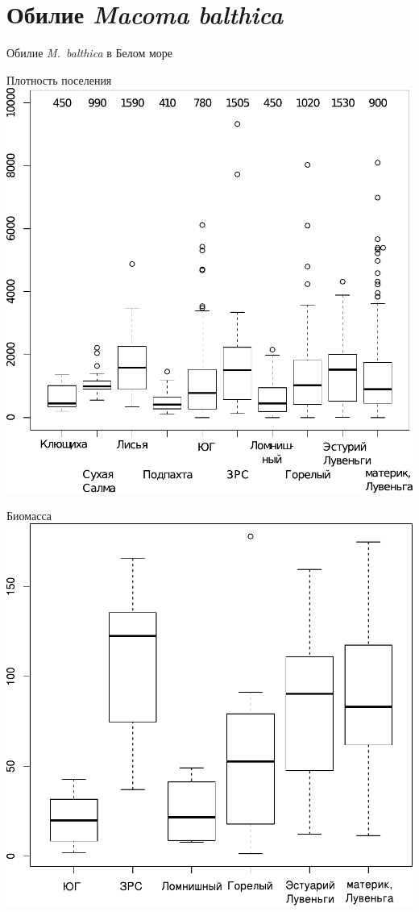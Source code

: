 \documentclass{beamer}
\begin{document}
		\section[Обилие]{Обилие {\it Macoma balthica}}
\begin{frame}{Обилие {\it M.~balthica} в Белом море}
	\begin{minipage}[t]{.49\linewidth}
		\begin{center}
		{\footnotesize Плотность поселения}
			\includegraphics[width=\textwidth]{N2_area_White1.pdf}
		\end{center}
	\end{minipage}
%
	\begin{minipage}[t]{.49\linewidth}
		\begin{center}
		{\footnotesize Биомасса}
			\includegraphics[width=\textwidth]{B_Kanda_ru1.pdf}

\end{center}
\end{minipage}
\end{frame}
\end{document}
